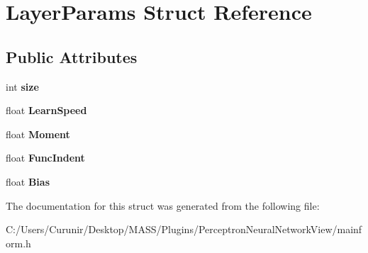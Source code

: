 \hypertarget{struct_layer_params}{}\section{Layer\+Params Struct Reference}
\label{struct_layer_params}
\subsection*{Public Attributes}
\begin{DoxyCompactItemize}
\item 
\mbox{\label{struct_layer_params_a2e54d0a4d2d5b21b74f3fe1201edf496}} 
int {\bfseries size}
\item 
\mbox{\label{struct_layer_params_a1461967bf879d4aa8eedcbd8557578ae}} 
float {\bfseries Learn\+Speed}
\item 
\mbox{\label{struct_layer_params_a8519674bc4f1a5aca12a75f2a64883fc}} 
float {\bfseries Moment}
\item 
\mbox{\label{struct_layer_params_aae57514ee2e26631a5117c4e51bfcc11}} 
float {\bfseries Func\+Indent}
\item 
\mbox{\label{struct_layer_params_a91105a7a6bbd8a8c6c4b60cb105f0008}} 
float {\bfseries Bias}
\end{DoxyCompactItemize}


The documentation for this struct was generated from the following file\+:\begin{DoxyCompactItemize}
\item 
C\+:/\+Users/\+Curunir/\+Desktop/\+M\+A\+S\+S/\+Plugins/\+Perceptron\+Neural\+Network\+View/mainform.\+h\end{DoxyCompactItemize}
